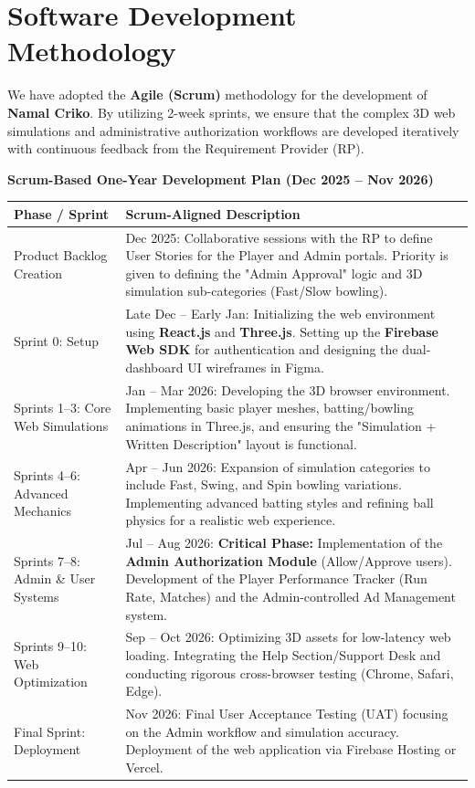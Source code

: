 \documentclass[12pt,a4paper]{article}
\begin{document}
\section{Software Development Methodology}
We have adopted the \textbf{Agile (Scrum)} methodology for the development of \textbf{Namal Criko}. By utilizing 2-week sprints, we ensure that the complex 3D web simulations and administrative authorization workflows are developed iteratively with continuous feedback from the Requirement Provider (RP).

\textbf{Scrum-Based One-Year Development Plan (Dec 2025 – Nov 2026)}

\begin{longtable}{|p{3.5cm}|p{9.5cm}|}
\hline
\textbf{Phase / Sprint} & \textbf{Scrum-Aligned Description} \\ \hline

Product Backlog Creation  & 
Dec 2025: Collaborative sessions with the RP to define User Stories for the Player and Admin portals. Priority is given to defining the "Admin Approval" logic and 3D simulation sub-categories (Fast/Slow bowling). 
\\ \hline

Sprint 0: Setup  & 
Late Dec – Early Jan: Initializing the web environment using \textbf{React.js} and \textbf{Three.js}. Setting up the \textbf{Firebase Web SDK} for authentication and designing the dual-dashboard UI wireframes in Figma. 
\\ \hline

Sprints 1–3: Core Web Simulations & 
Jan – Mar 2026: Developing the 3D browser environment. Implementing basic player meshes, batting/bowling animations in Three.js, and ensuring the "Simulation + Written Description" layout is functional.
\\ \hline

Sprints 4–6: Advanced Mechanics  & 
Apr – Jun 2026: Expansion of simulation categories to include Fast, Swing, and Spin bowling variations. Implementing advanced batting styles and refining ball physics for a realistic web experience.
\\ \hline

Sprints 7–8: Admin \& User Systems  & 
Jul – Aug 2026: \textbf{Critical Phase:} Implementation of the \textbf{Admin Authorization Module} (Allow/Approve users). Development of the Player Performance Tracker (Run Rate, Matches) and the Admin-controlled Ad Management system. 
\\ \hline

Sprints 9–10: Web Optimization  & 
Sep – Oct 2026: Optimizing 3D assets for low-latency web loading. Integrating the Help Section/Support Desk and conducting rigorous cross-browser testing (Chrome, Safari, Edge).
\\ \hline

Final Sprint: Deployment  & 
Nov 2026: Final User Acceptance Testing (UAT) focusing on the Admin workflow and simulation accuracy. Deployment of the web application via Firebase Hosting or Vercel. 
\\ \hline

\end{longtable}
\end{document}
